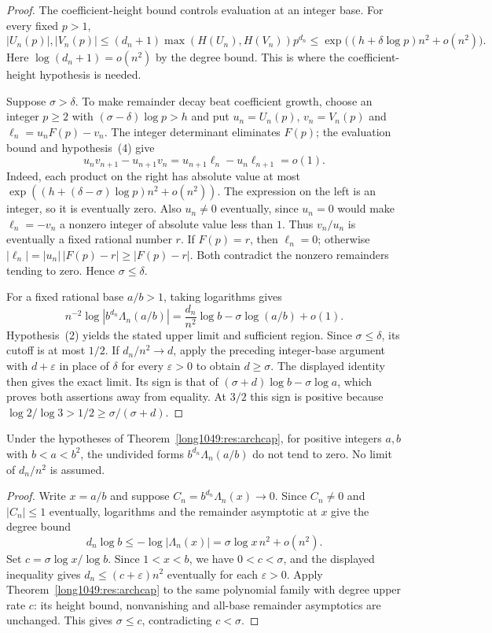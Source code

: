 \documentclass[11pt]{article}
\begin{document}
\begin{proof}
The coefficient-height bound controls evaluation at an integer base.
For every fixed $p>1$,
\[
 |U_n(p)|,|V_n(p)|
 \le (d_n+1)\max(H(U_n),H(V_n))p^{d_n}
 \le \exp\bigl((h+\delta\log p)n^2+o(n^2)\bigr).
\]
Here $\log(d_n+1)=o(n^2)$ by the degree bound. This is where the
coefficient-height hypothesis is needed.

Suppose $\sigma>\delta$. To make remainder decay beat coefficient growth,
choose an integer $p\ge2$ with $(\sigma-\delta)\log p>h$ and put
$u_n=U_n(p)$, $v_n=V_n(p)$ and $\ell_n=u_nF(p)-v_n$.
The integer determinant eliminates $F(p)$; the evaluation bound
and hypothesis~(4) give
\[
 u_nv_{n+1}-u_{n+1}v_n=u_{n+1}\ell_n-u_n\ell_{n+1}=o(1).
\]
Indeed, each product on the right has absolute value at most
$\exp((h+(\delta-\sigma)\log p)n^2+o(n^2))$.
The expression on the left is an integer, so it is eventually zero.
Also $u_n\ne0$ eventually, since $u_n=0$ would make $\ell_n=-v_n$
a nonzero integer of absolute value less than $1$.
Thus $v_n/u_n$ is eventually a fixed rational number $r$.
If $F(p)=r$, then $\ell_n=0$; otherwise
$|\ell_n|=|u_n|\,|F(p)-r|\ge|F(p)-r|$.
Both contradict the nonzero remainders tending to zero. Hence
$\sigma\le\delta$.

For a fixed rational base $a/b>1$, taking logarithms gives
\[
 n^{-2}\log|b^{d_n}\Lambda_n(a/b)|
 =\frac{d_n}{n^2}\log b-\sigma\log(a/b)+o(1).
\]
Hypothesis~(2) yields the stated upper limit and sufficient region.
Since $\sigma\le\delta$, its cutoff is at most $1/2$.
If $d_n/n^2\to d$, apply the preceding integer-base argument with
$d+\varepsilon$ in place of $\delta$ for every $\varepsilon>0$ to obtain
$d\ge\sigma$. The displayed identity then gives the exact limit.
Its sign is that of $(\sigma+d)\log b-\sigma\log a$, which proves
both assertions away from equality. At $3/2$ this sign is positive
because $\log2/\log3>1/2\ge\sigma/(\sigma+d)$.
\end{proof}

\begin{corollary}
\label{long1049:cor:no-decay-below-square}
Under the hypotheses of Theorem~\ref{long1049:res:archcap}, for positive integers
$a,b$ with $b<a<b^2$, the undivided forms $b^{d_n}\Lambda_n(a/b)$ do not
tend to zero.  No limit of $d_n/n^2$ is assumed.
\end{corollary}
\begin{proof}
Write $x=a/b$ and suppose $C_n=b^{d_n}\Lambda_n(x)\to0$.
Since $C_n\ne0$ and $|C_n|\le1$ eventually, logarithms and the
remainder asymptotic at $x$ give the degree bound
\[
 d_n\log b\le-\log|\Lambda_n(x)|
       =\sigma\log x\,n^2+o(n^2).
\]
Set $c=\sigma\log x/\log b$.  Since $1<x<b$, we have $0<c<\sigma$,
and the displayed inequality gives $d_n\le(c+\varepsilon)n^2$ eventually
for each $\varepsilon>0$. Apply Theorem~\ref{long1049:res:archcap} to
the same polynomial family with degree upper rate $c$: its height bound,
nonvanishing and all-base remainder asymptotics are unchanged. This gives
$\sigma\le c$, contradicting $c<\sigma$.
\end{proof}
\end{document}
